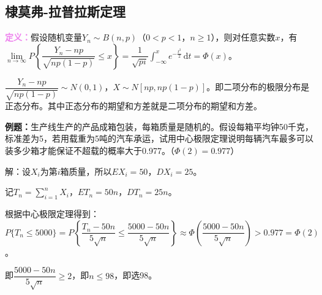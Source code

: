 \documentclass[UTF8, 12pt]{ctexart}
\begin{document}
\subsection{棣莫弗-拉普拉斯定理}

\textcolor{violet}{\textbf{定义：}}假设随机变量$Y_n\sim B(n,p)$（$0<p<1$，$n\geqslant1$），则对任意实数$x$，有$\lim\limits_{n\to\infty}P\left\{\dfrac{Y_n-np}{\sqrt{np(1-p)}}\leqslant x\right\}=\dfrac{1}{\sqrt{pi}}\int_{-\infty}^xe^{-\frac{t^2}{2}}\,\textrm{d}t=\varPhi(x)$。\medskip

$\dfrac{Y_n-np}{\sqrt{np(1-p)}}\sim N(0,1)$，$X\sim N[np,np(1-p)]$。即二项分布的极限分布是正态分布。其中正态分布的期望和方差就是二项分布的期望和方差。

\textbf{例题：}生产线生产的产品成箱包装，每箱质量是随机的。假设每箱平均钟50千克，标准差为5，若用载重为5吨的汽车承运，试用中心极限定理说明每辆汽车最多可以装多少箱才能保证不超载的概率大于0.977。（$\varPhi(2)=0.977$）

解：设$X_i$为第$i$箱质量，所以$EX_i=50$，$DX_i=25$。

记$T_n=\sum\limits_{i=1}^nX_i$，$ET_n=50n$，$DT_n=25n$。

根据中心极限定理得到：$P\{T_n\leqslant5000\}=P\left\{\dfrac{T_n-50n}{5\sqrt{n}}\leqslant\dfrac{5000-50n}{5\sqrt{n}}\right\}\approx\varPhi\left(\dfrac{5000-50n}{5\sqrt{n}}\right)>0.977=\varPhi(2)$。

即$\dfrac{5000-50n}{5\sqrt{n}}\geqslant2$，即$n\leqslant98$，即选98。
\end{document}

